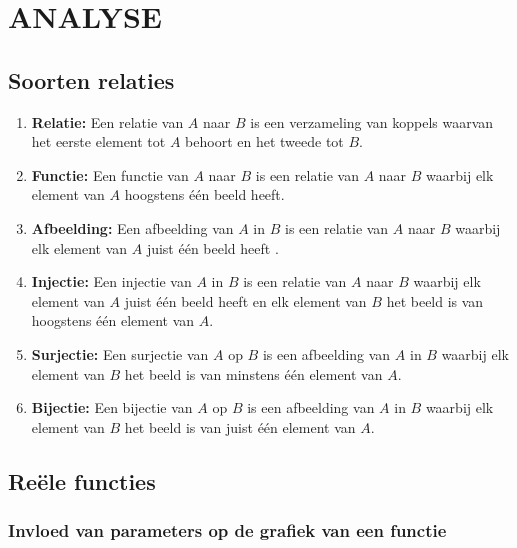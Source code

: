 \hypertarget{analyse}{}
\section{ANALYSE} \label{analyse}

\hypertarget{relaties}{}
\subsection{Soorten relaties} \label{relaties}

\begin{enumerate}
\item {\bf Relatie: } Een relatie van $A$ naar $B$ is een verzameling van koppels waarvan het eerste element tot $A$ behoort en het tweede tot $B$.
\item {\bf Functie: } Een \hypertarget{functie}{functie} van $A$ naar $B$ is een relatie van $A$ naar $B$ waarbij elk element van $A$ hoogstens \'e\'en beeld heeft.\label{functie}
\item {\bf Afbeelding: } Een afbeelding  van $A$ in $B$ is een relatie van $A$ naar $B$ waarbij elk element van $A$ juist \'e\'en beeld heeft .
\item {\bf Injectie: } Een injectie van $A$ in $B$ is een relatie van $A$ naar $B$ waarbij elk element van $A$ juist \'e\'en beeld heeft en elk element van $B$ het beeld is van hoogstens \'e\'en element van $A$.
\item {\bf Surjectie: } Een surjectie van $A$ op $B$ is een afbeelding van $A$ in $B$ waarbij elk element van $B$ het beeld is van minstens \'e\'en element van $A$.
\item {\bf Bijectie: } Een bijectie van $A$ op $B$ is een afbeelding van $A$ in $B$ waarbij elk element van $B$ het beeld is van juist \'e\'en element van $A$.
\end{enumerate}

\hypertarget{reele_functies}{}
\subsection{Re\"ele functies} \label{reele_functies}

\hypertarget{parameters}{}
\subsubsection{Invloed van parameters op de grafiek van een functie} \label{parameters}

